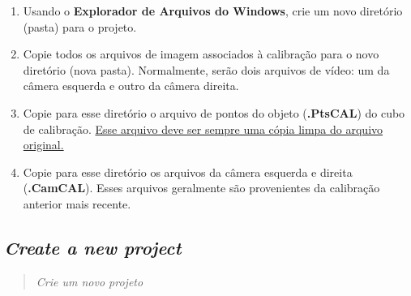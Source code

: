 \documentclass[
  12pt,
  letterpaper,
  DIV=11,
  numbers=noendperiod]{scrreprt}
\begin{document}
\begin{enumerate}
\def\labelenumi{\arabic{enumi}.}
\item
  Usando o \textbf{Explorador de Arquivos do Windows}, crie um novo
  diretório (pasta) para o projeto.
\item
  Copie todos os arquivos de imagem associados à calibração para o novo
  diretório (nova pasta). Normalmente, serão dois arquivos de vídeo: um
  da câmera esquerda e outro da câmera direita.
\item
  Copie para esse diretório o arquivo de pontos do objeto
  (\textbf{.PtsCAL}) do cubo de calibração. \ul{Esse arquivo deve ser
  sempre uma cópia limpa do arquivo original.}
\item
  Copie para esse diretório os arquivos da câmera esquerda e direita
  (\textbf{.CamCAL}). Esses arquivos geralmente são provenientes da
  calibração anterior mais recente.
\end{enumerate}

\subsection{\texorpdfstring{\emph{Create a new
project}}{Create a new project}}\label{create-a-new-project}

\begin{quote}
\emph{Crie um novo projeto}
\end{quote}
\end{document}
